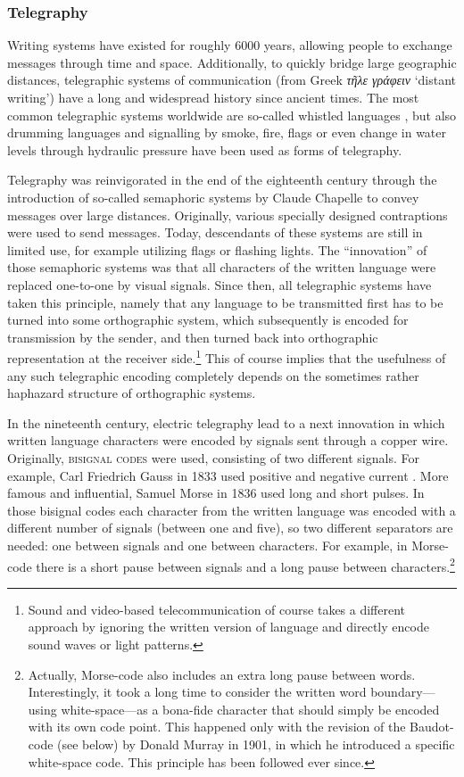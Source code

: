 \subsubsection*{Telegraphy}

Writing systems have existed for roughly 6000 years, allowing people to exchange
messages through time and space. Additionally, to quickly bridge large geographic
distances, telegraphic systems of communication (from Greek \emph{τῆλε
γράφειν} `distant writing') have a long and widespread history since ancient
times. The most common telegraphic systems worldwide are so-called whistled
languages \citep{Meyer2015}, but also drumming languages \citep{Meyer2012} and
signalling by smoke, fire, flags or even change in water levels through
hydraulic pressure have been used as forms of telegraphy. 

Telegraphy was reinvigorated in the end of the eighteenth century through the
introduction of so-called semaphoric systems by Claude Chapelle to convey
messages over large distances. Originally, various specially designed
contraptions were used to send messages. Today, descendants of these systems are
still in limited use, for example utilizing flags or flashing lights. The
``innovation'' of those semaphoric systems was that all characters of the
written language were replaced one-to-one by visual signals. Since then, all
telegraphic systems have taken this principle, namely that any language to be
transmitted first has to be turned into some orthographic system, which
subsequently is encoded for transmission by the sender, and then turned back
into orthographic representation at the receiver side.\footnote{Sound and
video-based telecommunication of course takes a different approach by ignoring
the written version of language and directly encode sound waves or light
patterns.} This of course implies that the usefulness of any such telegraphic
encoding completely depends on the sometimes rather haphazard structure of
orthographic systems.

In the nineteenth century, electric telegraphy lead to a next innovation in
which written language characters were encoded by signals sent through a copper
wire. Originally, \textsc{bisignal codes} were used, consisting of two different
signals. For example, Carl Friedrich Gauss in 1833 used positive and negative
current \citep[282]{Mania2008}. More famous and influential, Samuel Morse in
1836 used long and short pulses. In those bisignal codes each character from the
written language was encoded with a different number of signals (between one and
five), so two different separators are needed: one between signals and one
between characters. For example, in Morse-code there is a short pause between
signals and a long pause between characters.\footnote{Actually, Morse-code also
includes an extra long pause between words. Interestingly, it took a long time
to consider the written word boundary---using white-space---as a bona-fide
character that should simply be encoded with its own code point. This happened
only with the revision of the Baudot-code (see below) by Donald Murray in 1901,
in which he introduced a specific white-space code. This principle has been
followed ever since.}

